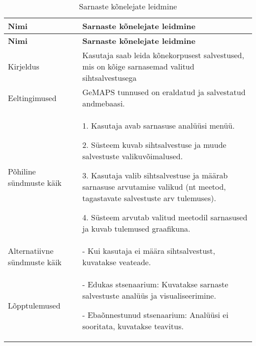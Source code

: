 \begin{longtable}{|p{2.5cm}|p{11cm}|}
    \caption{{Sarnaste kõnelejate leidmine}}
    \label{tab:kasutusjuht4}\\ \hline
    \textbf{Nimi} &  \textbf{Sarnaste kõnelejate leidmine}  \\
    \hline
    \endfirsthead
    \hline
    \textbf{Nimi} &  \textbf{Sarnaste kõnelejate leidmine}  \\
    \hline
    \endhead
    \hline
    \endfoot
    \hline
    \endlastfoot
    Kirjeldus & Kasutaja saab leida kõnekorpusest salvestused, mis on kõige sarnasemad valitud sihtsalvestusega\\ \hline
    Eeltingimused & GeMAPS tunnused on eraldatud ja salvestatud andmebaasi.\\ \hline
    Põhiline sündmuste käik & 
    1. Kasutaja avab sarnasuse analüüsi menüü.
    
    2. Süsteem kuvab sihtsalvestuse ja muude salvestuste valikuvõimalused.
    
    3. Kasutaja valib sihtsalvestuse ja määrab sarnasuse arvutamise valikud (nt meetod, tagastavate salvestuste arv tulemuses).
    
    4. Süsteem arvutab valitud meetodil sarnasused ja kuvab tulemused graafikuna.
    \\ \hline
    Alternatiivne sündmuste käik & 
    - Kui kasutaja ei määra sihtsalvestust, kuvatakse veateade.
    \\ \hline
    Lõpptulemused & 
    - Edukas stsenaarium: Kuvatakse sarnaste salvestuste analüüs ja visualiseerimine.
    
    - Ebaõnnestunud stsenaarium: Analüüsi ei sooritata, kuvatakse teavitus.
    \\ \hline
\end{longtable}

